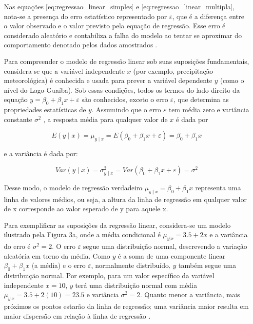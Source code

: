 Nas equações \ref{eq:regressao_linear_simples} e \ref{eq:regressao_linear_multipla}, nota-se a presença do erro estatístico representado por $\varepsilon$, que é a diferença entre o valor observado e o valor previsto pela equação de regressão. Esse erro é considerado aleatório e contabiliza a falha do modelo ao tentar se aproximar do comportamento denotado pelos dados amostrados \cite{montgomery2012}.

Para compreender o modelo de regressão linear sob suas suposições fundamentais, considera-se que a variável independente $ x $ (por exemplo, precipitação meteorológica) é conhecida e usada para prever a variável dependente $ y $ (como o nível do Lago Guaíba). Sob essas condições, todos os termos do lado direito da equação $ y = \beta_0 + \beta_1 x + \varepsilon $ são conhecidos, exceto o erro $ \varepsilon $, que determina as propriedades estatísticas de $ y $. Assumindo que o erro $ \varepsilon $ tem média zero e variância constante $ \sigma^2 $ \cite{montgomery2012}, a resposta média para qualquer valor de $ x $ é dada por

\begin{equation}
	E(y \mid x) = \mu_{y \mid x} = E(\beta_0 + \beta_1x + \varepsilon) = \beta_0 + \beta_1x
\end{equation}

e a variância é dada por:

\begin{equation}
	Var (y \mid x) = \sigma_{y \mid x}^2 = Var(\beta_0 + \beta_1x + \varepsilon) = \sigma^2
\end{equation}

Desse modo, o modelo de regressão verdadeiro $\mu_{y \mid x} = \beta_0 + \beta_1x$ representa uma linha de valores médios, ou seja, a altura da linha de regressão em qualquer valor de x corresponde ao valor esperado de y para aquele x.

Para exemplificar as suposições da regressão linear, considera-se um modelo ilustrado pela Figura 3a, onde a média condicional é $ \mu_{y|x} = 3.5 + 2x $ e a variância do erro é $ \sigma^2 = 2 $. O erro $ \varepsilon $ segue uma distribuição normal, descrevendo a variação aleatória em torno da média. Como $ y $ é a soma de uma componente linear $ \beta_0 + \beta_1 x $ (a média) e o erro $ \varepsilon $, normalmente distribuído, $ y $ também segue uma distribuição normal. Por exemplo, para um valor específico da variável independente $ x = 10 $, $ y $ terá uma distribuição normal com média $ \mu_{y|x} = 3.5 + 2(10) = 23.5 $ e variância $ \sigma^2 = 2 $. Quanto menor a variância, mais próximos os pontos estarão da linha de regressão; uma variância maior resulta em maior dispersão em relação à linha de regressão \cite{montgomery2012}.

